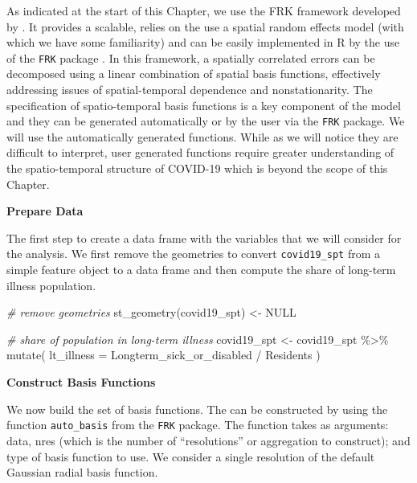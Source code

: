 \documentclass[
]{book}
\newenvironment{Shaded}{\begin{snugshade}}{\end{snugshade}}
\newcommand{\AttributeTok}[1]{\textcolor[rgb]{0.77,0.63,0.00}{#1}}
\newcommand{\CommentTok}[1]{\textcolor[rgb]{0.56,0.35,0.01}{\textit{#1}}}
\newcommand{\ConstantTok}[1]{\textcolor[rgb]{0.00,0.00,0.00}{#1}}
\newcommand{\FunctionTok}[1]{\textcolor[rgb]{0.00,0.00,0.00}{#1}}
\newcommand{\NormalTok}[1]{#1}
\newcommand{\OtherTok}[1]{\textcolor[rgb]{0.56,0.35,0.01}{#1}}
\newcommand{\SpecialCharTok}[1]{\textcolor[rgb]{0.00,0.00,0.00}{#1}}
\begin{document}
As indicated at the start of this Chapter, we use the FRK framework developed by \citet{cressie2008fixed}. It provides a scalable, relies on the use a spatial random effects model (with which we have some familiarity) and can be easily implemented in R by the use of the \texttt{FRK} package \citep{zammit2017frk}. In this framework, a spatially correlated errors can be decomposed using a linear combination of spatial basis functions, effectively addressing issues of spatial-temporal dependence and nonstationarity. The specification of spatio-temporal basis functions is a key component of the model and they can be generated automatically or by the user via the \texttt{FRK} package. We will use the automatically generated functions. While as we will notice they are difficult to interpret, user generated functions require greater understanding of the spatio-temporal structure of COVID-19 which is beyond the scope of this Chapter.

\textbf{Prepare Data}

The first step to create a data frame with the variables that we will consider for the analysis. We first remove the geometries to convert \texttt{covid19\_spt} from a simple feature object to a data frame and then compute the share of long-term illness population.

\begin{Shaded}
\begin{Highlighting}[]
\CommentTok{\# remove geometries}
\FunctionTok{st\_geometry}\NormalTok{(covid19\_spt) }\OtherTok{\textless{}{-}} \ConstantTok{NULL}

\CommentTok{\# share of population in long{-}term illness }
\NormalTok{covid19\_spt }\OtherTok{\textless{}{-}}\NormalTok{ covid19\_spt }\SpecialCharTok{\%\textgreater{}\%} \FunctionTok{mutate}\NormalTok{(}
 \AttributeTok{lt\_illness =}\NormalTok{ Longterm\_sick\_or\_disabled }\SpecialCharTok{/}\NormalTok{ Residents}
\NormalTok{)}
\end{Highlighting}
\end{Shaded}

\textbf{Construct Basis Functions}

We now build the set of basis functions. The can be constructed by using the function \texttt{auto\_basis} from the \texttt{FRK} package. The function takes as arguments: data, nres (which is the number of ``resolutions'' or aggregation to construct); and type of basis function to use. We consider a single resolution of the default Gaussian radial basis function.
\end{document}
